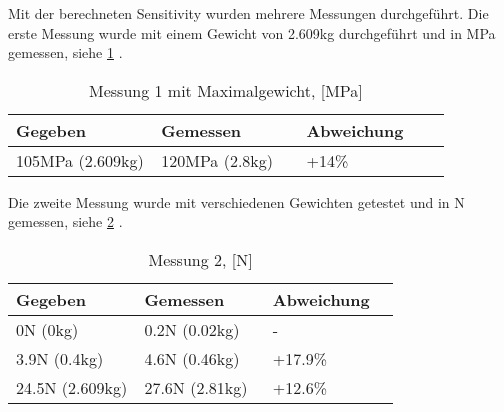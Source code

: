 

Mit der berechneten Sensitivity wurden mehrere Messungen durchgeführt.
Die erste Messung wurde mit einem Gewicht von 2.609kg durchgeführt und in MPa gemessen, siehe \ref{tbl:biegebalkenmessungeins} .

\bgroup
\def\arraystretch{2}
\begin{table}[h]
\centering
\begin{tabular}{|p{0.33\linewidth}|p{0.33\linewidth}|p{0.33\linewidth}|}
\hline
Gegeben & Gemessen & Abweichung \\ \hline
105MPa (2.609kg) & 120MPa (2.8kg) & +14\% \\ \hline
\end{tabular}
\caption{Messung 1 mit Maximalgewicht, [MPa]}
\label{tbl:biegebalkenmessungeins}

\end{table}
\egroup

Die zweite Messung wurde mit verschiedenen Gewichten getestet und in N gemessen, siehe \ref{tbl:biegebalkenmessungzwei} .
\bgroup
\def\arraystretch{2}
\begin{table}[h]
\centering
\begin{tabular}{|p{0.33\linewidth}|p{0.33\linewidth}|p{0.33\linewidth}|}
\hline
Gegeben & Gemessen & Abweichung \\ \hline
0N (0kg) & 0.2N (0.02kg) & - \\ \hline
3.9N (0.4kg) & 4.6N (0.46kg) & +17.9\%  \\ \hline
24.5N (2.609kg) & 27.6N (2.81kg)  & +12.6\% \\ \hline
\end{tabular}
\caption{Messung 2, [N]}
\label{tbl:biegebalkenmessungzwei}

\end{table}
\egroup

